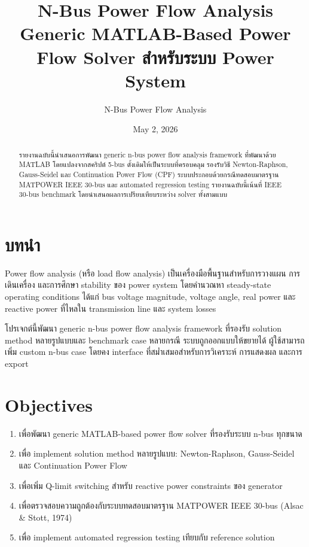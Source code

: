 \documentclass[12pt,a4paper]{article}
\title{\textbf{N-Bus Power Flow Analysis}\\
\large Generic MATLAB-Based Power Flow Solver สำหรับระบบ Power System}
\author{N-Bus Power Flow Analysis}
\date{May 2, 2026}
\begin{document}
\maketitle
\thispagestyle{empty}

\begin{abstract}
รายงานฉบับนี้นำเสนอการพัฒนา generic n-bus power flow analysis framework ที่พัฒนาด้วย MATLAB โดยแปลงจากสคริปต์ 5-bus ดั้งเดิมให้เป็นระบบที่ครอบคลุม รองรับวิธี Newton-Raphson, Gauss-Seidel และ Continuation Power Flow (CPF) ระบบประกอบด้วยกรณีทดสอบมาตรฐาน MATPOWER IEEE 30-bus และ automated regression testing รายงานฉบับนี้เน้นที่ IEEE 30-bus benchmark โดยนำเสนอผลการเปรียบเทียบระหว่าง solver ทั้งสามแบบ
\end{abstract}

\section{บทนำ}

Power flow analysis (หรือ load flow analysis) เป็นเครื่องมือพื้นฐานสำหรับการวางแผน การเดินเครื่อง และการศึกษา stability ของ power system โดยคำนวณหา steady-state operating conditions ได้แก่ bus voltage magnitude, voltage angle, real power และ reactive power ที่ไหลใน transmission line และ system losses

โปรเจกต์นี้พัฒนา generic n-bus power flow analysis framework ที่รองรับ solution method หลายรูปแบบและ benchmark case หลายกรณี ระบบถูกออกแบบให้ขยายได้ ผู้ใช้สามารถเพิ่ม custom n-bus case โดยคง interface ที่สม่ำเสมอสำหรับการวิเคราะห์ การแสดงผล และการ export

\section{Objectives}

\begin{enumerate}
    \item เพื่อพัฒนา generic MATLAB-based power flow solver ที่รองรับระบบ n-bus ทุกขนาด
    \item เพื่อ implement solution method หลายรูปแบบ: Newton-Raphson, Gauss-Seidel และ Continuation Power Flow
    \item เพื่อเพิ่ม Q-limit switching สำหรับ reactive power constraints ของ generator
    \item เพื่อตรวจสอบความถูกต้องกับระบบทดสอบมาตรฐาน MATPOWER IEEE 30-bus (Alsac \& Stott, 1974)
    \item เพื่อ implement automated regression testing เทียบกับ reference solution
\end{enumerate}
\end{document}
